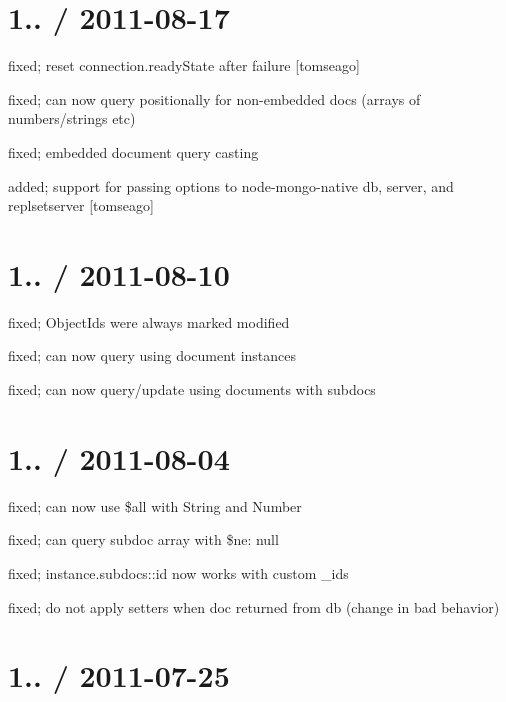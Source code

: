 \section*{1.. / 2011-\/08-\/17 }


\begin{DoxyItemize}
\item fixed; reset connection.\+ready\+State after failure \mbox{[}tomseago\mbox{]}
\item fixed; can now query positionally for non-\/embedded docs (arrays of numbers/strings etc)
\item fixed; embedded document query casting
\item added; support for passing options to node-\/mongo-\/native db, server, and replsetserver \mbox{[}tomseago\mbox{]}
\end{DoxyItemize}

\section*{1.. / 2011-\/08-\/10 }


\begin{DoxyItemize}
\item fixed; Object\+Ids were always marked modified
\item fixed; can now query using document instances
\item fixed; can now query/update using documents with subdocs
\end{DoxyItemize}

\section*{1.. / 2011-\/08-\/04 }


\begin{DoxyItemize}
\item fixed; can now use \$all with String and Number
\item fixed; can query subdoc array with \$ne\+: null
\item fixed; instance.\+subdocs\+::id now works with custom \+\_\+ids
\item fixed; do not apply setters when doc returned from db (change in bad behavior)
\end{DoxyItemize}

\section*{1.. / 2011-\/07-\/25 }


